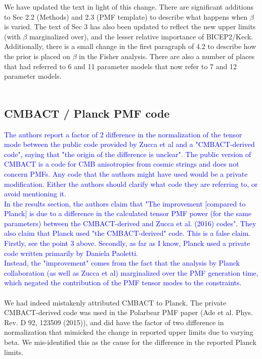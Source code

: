 \documentclass{article}
\newcommand{\reviewer}[1]{\textcolor{Blue}{#1}}
\begin{document}
We have updated the text in light of this change. There are significant additions to Sec 2.2 (Methods) and 2.3 (PMF template) to describe what happens when $\beta$ is varied. The text of Sec 3 has also been updated to reflect the new upper limits (with $\beta$ marginalized over), and the lesser relative importance of BICEP2/Keck.\\

Additionally, there is a small change in the first paragraph of 4.2 to describe how the prior is placed on $\beta$ in the Fisher analysis. There are also a number of places that had referred to 6 and 11 parameter models that now refer to 7 and 12 parameter models. \\\\



\subsection{CMBACT / Planck PMF code}
\reviewer{The authors report a factor of 2 difference in the normalization of the tensor mode between the public code provided by Zucca et al and a "CMBACT-derived code", saying that "the origin of the difference is unclear". The public version of CMBACT is a code for CMB anisotropies from cosmic strings and does not concern PMFs. Any code that the authors might have used would be a private modification. Either the authors should clarify what code they are referring to, or avoid mentioning it.\\
In the results section, the authors claim that "The improvement [compared to Planck] is due to a difference in the calculated tensor PMF power (for the same parameters) between the CMBACT-derived and Zucca et al. (2016) codes". They also claim that Planck used "the CMBACT-derived" code. This is a false claim. Firstly, see the point 3 above. Secondly, as far as I know, Planck used a private code written primarily by Daniela Paoletti.\\
Instead, the "improvement" comes from the fact that the analysis by Planck collaboration (as well as Zucca et al) marginalized over the PMF generation time, which negated the contribution of the PMF tensor modes to the constraints.}
\\\\

We had indeed mistakenly attributed CMBACT to Planck. 
The private CMBACT-derived code was used in the Polarbear PMF paper (Ade et al. Phys. Rev. D 92, 123509 (2015)), and did have the factor of two difference in normalization that mimicked the change in reported upper limits due to varying beta. 
We mis-identified this as the cause for the difference in the reported Planck limits.\\
\end{document}
